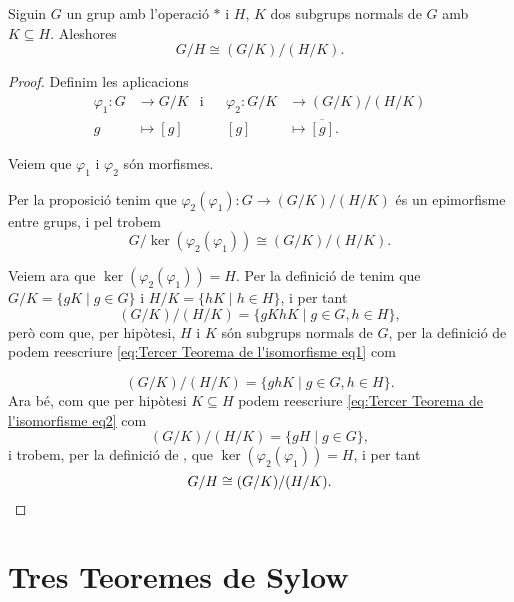 \documentclass[../Apunts.tex]{subfiles}
\begin{document}
	\begin{theorem}
		\label{thm:Tercer Teorema de l'isomorfisme entre grups}
		Siguin \(G\) un grup amb l'operació \(\ast\) i \(H\), \(K\) dos subgrups normals de \(G\) amb \(K\subseteq H\). Aleshores
		\[G/H\cong (G/K)/(H/K).\]
		\begin{proof}
			Definim les aplicacions
			\begin{align*}
			\varphi_{1}\colon G&\longrightarrow G/K&\text{i}&&\varphi_{2}\colon G/K&\longrightarrow(G/K)/(H/K)\\
			g&\longmapsto[g]&&&[g]&\longmapsto\overline{[g]}.
			\end{align*}
			
			Veiem que \(\varphi_{1}\) i \(\varphi_{2}\) són morfismes.
			
			Per la proposició  tenim que \(\varphi_{2}(\varphi_{1})\colon G\longrightarrow(G/K)/(H/K)\) és un epimorfisme entre grups, %
			i pel  trobem
			\[G/\ker(\varphi_{2}(\varphi_{1}))\cong(G/K)/(H/K).\]
			
			Veiem ara que \(\ker(\varphi_{2}(\varphi_{1}))=H\). Per la definició de  tenim que \(G/K=\{gK\mid g\in G\}\) i \(H/K=\{hK\mid h\in H\}\), i per tant
			\begin{equation}
			\label{eq:Tercer Teorema de l'isomorfisme eq1}
			(G/K)/(H/K)=\{gKhK\mid g\in G, h\in H\},
			\end{equation}
			però com que, per hipòtesi, \(H\) i \(K\) són subgrups normals de \(G\), per la definició de  podem reescriure \eqref{eq:Tercer Teorema de l'isomorfisme eq1} com
			
			\begin{equation}\label{eq:Tercer Teorema de l'isomorfisme eq2}
			(G/K)/(H/K)=\{ghK\mid g\in G,h\in H\}.
			\end{equation}
			Ara bé, com que per hipòtesi \(K\subseteq H\) podem reescriure \eqref{eq:Tercer Teorema de l'isomorfisme eq2} com
			\[(G/K)/(H/K)=\{gH\mid g\in G\},\]
			i trobem, per la definició de , que \(\ker(\varphi_{2}(\varphi_{1}))=H\), i per tant
			\[G/H\cong (G/K)/(H/K).\qedhere\]
		\end{proof}
	\end{theorem}
	\section{Tres Teoremes de Sylow}
\end{document}
